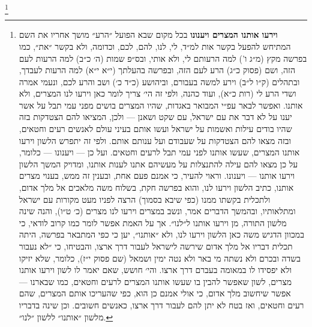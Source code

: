 \documentclass[12pt, openany]{book}
\newcommand{\footnotecomment}[1]{
	\renewcommand\thefootnote{}
	\footnote{\textsf{#1}}}
\newcommand{\commenta}[1]{\footnotecomment{#1}\hspace{0em}}
\begin{document}
\commenta{\textrm{\textbf{וירעו אותנו המצרים ויענונו}} בכל מקום שבא הפועל ״הרע״ מושך אחריו את השם המתיחש להפעל בקשר אות למ״ד, לי, לנו, להם, לכם, וכדומה, ולא בקשר ״את״, כמו בפרשה מקץ (מ״ג ו') למה הרעותם לי, ולא אותי, ובס״פ שמות (ה׳ כ״ב) למה הרעות  לעם הזה, ושם (פסוק כ״ג) הרע לעם הזה, ובפרשה בהעלתך (י״א י״א) למה הרעות לעבדך, ובתהלים (ק״ו ל״ב) וירע למשה בעבורם, וביהושע (כ״ד כ׳) ושב והרע לכם, ונעמי אמרה ושדי הרע לי (רות כ״א), ועוד כהנה, ולפי זה הי׳ צריך לומר כאן וירעו לנו המצרים, ולא אותנו. ואפשר לבאר עפ״י המבואר באגדות, שהיו המצרים בושים מפני עמי תבל על אשר יענו על לא דבר את עם ישראל, עם שקט ושאנן — ולכן, המציאו להם הצטדקות בזה שהיו בודים עילות ואשמות על ישראל ועשו אותם בעיני עולם לאנשים רעים וחטאים, ובזה מצאו להם הצטדקות על שעבודם ועל ענותם אותם. ולפי זה יתפרש הלשון וירעו אותנו המצרים, שעשו אותנו לפני עמי תבל לרעים וחטאים. ועל כן — ויענונו — כלומר, על כן מצאו להם עילה להתנצלות על מעשיהם אתנו לענות אותנו, ומדויק המשך הלשון וירעו אותנו — ויענונו. וראוי להעיר, כי אמנם פעם אחת, ובענין זה ממש, בענוי מצרים אותנו, כתיב הלשון וירעו לנו, והוא בפרשה חקת, בשלוח משה מלאכים אל מלך אדום, ולתכלית בקשתו ממנו (כפי שיבא בסמוך) הרצה לפניו מעט מקורות עם ישראל ומתלאותיו, ובהמשך הדברים אמר, ונשב במצרים וירעו לנו מצרים (כ׳ ט״ו), והנה שינה מלשון התורה, מן וירעו אותנו ל״לנו״. אך על האמת אפשר לומר כמו קרוב לודאי, כי במכוון הדגיש משה כאן הלשון וירעו לנו, ולא ״אותנו״, יען כי כפי המתבאר בפרשה, היתה תכלית דבריו אל מלך אדום שירשה לישראל לעבור דרך ארצו, והבטיחו, כי ״לא נעבור בשדה ובכרם ולא נשתה מי באר ולא נטה ימין ושמאל (שם פסוק י״ז), כלומר, שלא יזיקו ולא יפסידו לו במאומה בעברם דרך ארצו. והי׳ חושש, שאם יאמר לו לשון וירעו אותנו מצרים, לשון שאפשר להבין בו שעשו אותנו המצרים לרעים וחטאים, כמו שבארנו — אפשר שיחשוב מלך אדום, כי אולי אמנם כן הוא, כפי שהעריכו אותם המצרים, שהם רעים וחטאים, ואז בטח לא יתן להם לעבור דרך ארצו, כאנשים חשובים. וכן שינה בדבריו מלשון ״אותנו״ ללשון ״לנו״.}%
\end{document}
